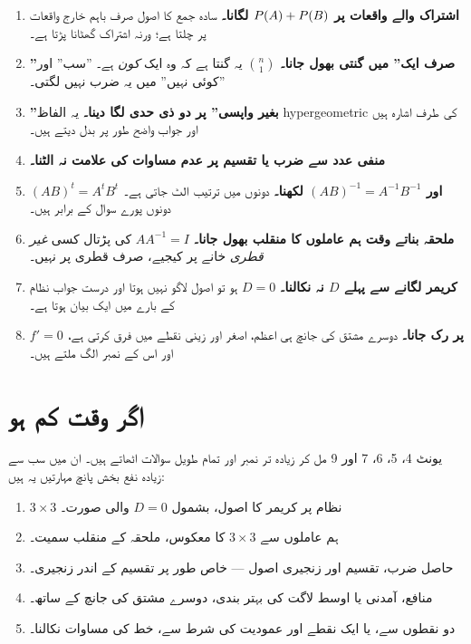 \begin{enumerate}
  \item \textbf{اشتراک والے واقعات پر \(P\!\left(A\right)+P\!\left(B\right)\) لگانا۔} سادہ جمع کا
        اصول صرف باہم خارج واقعات پر چلتا ہے؛ ورنہ اشتراک گھٹانا پڑتا ہے۔
  \item \textbf{''صرف ایک'' میں گنتی بھول جانا۔} \(\binom{n}{1}\) یہ گنتا ہے کہ
        وہ ایک \emph{کون} ہے۔ ''سب'' اور ''کوئی نہیں'' میں یہ ضرب نہیں لگتی۔
  \item \textbf{''بغیر واپسی'' پر دو ذی حدی لگا دینا۔} یہ الفاظ
        \textenglish{hypergeometric} کی طرف اشارہ ہیں اور جواب واضح طور پر بدل
        دیتے ہیں۔
  \item \textbf{منفی عدد سے ضرب یا تقسیم پر عدم مساوات کی علامت نہ الٹنا۔}
  \item \textbf{\((AB)^{t}=A^{t}B^{t}\) اور \((AB)^{-1}=A^{-1}B^{-1}\) لکھنا۔}
        دونوں میں ترتیب الٹ جاتی ہے۔ دونوں پورے سوال کے برابر ہیں۔
  \item \textbf{ملحقہ بناتے وقت ہم عاملوں کا منقلب بھول جانا۔}
        \(AA^{-1}=I\) کی پڑتال کسی \emph{غیر قطری} خانے پر کیجیے، صرف قطری پر
        نہیں۔
  \item \textbf{کریمر لگانے سے پہلے \(D\) نہ نکالنا۔} \(D=0\) ہو تو اصول لاگو
        نہیں ہوتا اور درست جواب نظام کے بارے میں ایک بیان ہوتا ہے۔
  \item \textbf{\(f'=0\) پر رک جانا۔} دوسرے مشتق کی جانچ ہی اعظم، اصغر اور زینی
        نقطے میں فرق کرتی ہے، اور اس کے نمبر الگ ملتے ہیں۔
\end{enumerate}

\section*{اگر وقت کم ہو}

یونٹ \textenglish{4}، \textenglish{5}، \textenglish{6}، \textenglish{7} اور
\textenglish{9} مل کر زیادہ تر نمبر اور تمام طویل سوالات اٹھاتے ہیں۔ ان میں سب
سے زیادہ نفع بخش پانچ مہارتیں یہ ہیں:

\begin{enumerate}
  \item \(3\times3\) نظام پر کریمر کا اصول، بشمول \(D=0\) والی صورت۔
  \item ہم عاملوں سے \(3\times3\) کا معکوس، ملحقہ کے منقلب سمیت۔
  \item حاصل ضرب، تقسیم اور زنجیری اصول --- خاص طور پر تقسیم کے اندر زنجیری۔
  \item منافع، آمدنی یا اوسط لاگت کی بہتر بندی، دوسرے مشتق کی جانچ کے ساتھ۔
  \item دو نقطوں سے، یا ایک نقطے اور عمودیت کی شرط سے، خط کی مساوات نکالنا۔
\end{enumerate}

